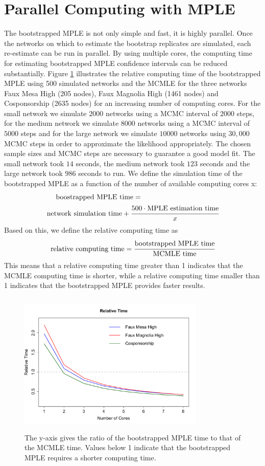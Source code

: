 \documentclass[10pt, conference, compsocconf]{IEEEtran}
\begin{document}
\section{Parallel Computing with MPLE}
The bootstrapped MPLE is not only simple and fast, it is highly parallel. Once the networks on which to estimate the bootstrap replicates are simulated, each re-estimate can be run in parallel. By using multiple cores, the computing time for estimating bootstrapped MPLE confidence intervals can be reduced substantially. Figure \ref{comptime} illustrates the relative computing time of the bootstrapped MPLE using 500 simulated networks and the MCMLE for the three networks Faux Mesa High (205 nodes), Faux Magnolia High (1461 nodes) and Cosponsorship (2635 nodes) for an increasing number of computing cores. For the small network we simulate $2000$ networks using a MCMC interval of $2000$ steps, for the medium network we simulate $8000$ networks using a MCMC interval of $5000$ steps and for the large network we simulate $10000$ networks using $30,000$ MCMC steps in order to approximate the likelihood appropriately. The chosen sample sizes and MCMC steps are necessary to guarantee a good model fit. The small network took $14$ seconds, the medium network took $123$ seconds and the large network took $986$ seconds to run. We define the simulation time of the bootstrapped MPLE as a function of the number of available computing cores x:
\begin{equation*}
\begin{split}
\text{boostrapped MPLE time} = ~~~~~~~~~~~~~~~~~~~~~~~~~~~~~~~~~ \\ \text{network simulation time} + \cfrac{500 \cdot \text{MPLE estimation time}}{x}
\end{split}
\end{equation*}     
Based on this, we define the relative computing time as
$$\text{relative computing time}= \cfrac{\text{bootstrapped MPLE time}}{\text{MCMLE time}}$$
This means that a relative computing time greater than 1 indicates that the MCMLE computing time is shorter, while a relative computing time smaller than 1 indicates that the bootstrapped MPLE provides faster results. \\
\begin{figure}[!t]
\centering
\includegraphics[width=3.5in, height=2.7in]{rel_time}
\caption{The y-axis gives the ratio of the bootstrapped MPLE time to that of the MCMLE time. Values below 1 indicate that the bootstrapped MPLE requires a shorter computing time.}
\label{comptime}
\end{figure}
\end{document}
